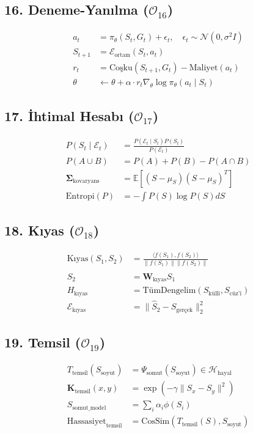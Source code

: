 \documentclass[11pt, a4paper]{article}
\begin{document}
\subsection{16. Deneme-Yanılma ($\mathcal{O}_{16}$)}
\begin{align}
a_t &= \pi_\theta(S_t, G_t) + \epsilon_t, \quad \epsilon_t \sim \mathcal{N}(0, \sigma^2 I) \\
S_{t+1} &= \mathcal{E}_{\text{ortam}}(S_t, a_t) \\
r_t &= \text{Coşku}(S_{t+1}, G_t) - \text{Maliyet}(a_t) \\
\theta &\leftarrow \theta + \alpha \cdot r_t \nabla_\theta \log \pi_\theta(a_t \mid S_t)
\end{align}

\subsection{17. İhtimal Hesabı ($\mathcal{O}_{17}$)}
\begin{align}
P(S_t \mid \mathcal{E}_t) &= \frac{P(\mathcal{E}_t \mid S_t) P(S_t)}{P(\mathcal{E}_t)} \\
P(A \cup B) &= P(A) + P(B) - P(A \cap B) \\
\mathbf{\Sigma}_{\text{kovaryans}} &= \mathbb{E}\left[ (S - \mu_S)(S - \mu_S)^T \right] \\
\text{Entropi}(P) &= -\int P(S) \log P(S) dS
\end{align}

\subsection{18. Kıyas ($\mathcal{O}_{18}$)}
\begin{align}
\text{Kıyas}(S_1, S_2) &= \frac{\langle f(S_1), f(S_2) \rangle}{\|f(S_1)\| \|f(S_2)\|} \\
\hat{S}_2 &= \mathbf{W}_{\text{kıyas}} S_1 \\
H_{\text{kıyas}} &= \text{TümDengelim}(S_{\text{küllî}}, S_{\text{cüz'î}}) \\
\mathcal{E}_{\text{kıyas}} &= \| \hat{S}_2 - S_{\text{gerçek}} \|_2^2
\end{align}

\subsection{19. Temsil ($\mathcal{O}_{19}$)}
\begin{align}
T_{\text{temsil}}(S_{\text{soyut}}) &= \Psi_{\text{somut}}(S_{\text{soyut}}) \in \mathcal{H}_{\text{hayal}} \\
\mathbf{K}_{\text{temsil}}(x, y) &= \exp\left( -\gamma \|S_x - S_y\|^2 \right) \\
S_{\text{somut\_model}} &= \sum_i \alpha_i \phi(S_i) \\
\text{Hassasiyet}_{\text{temsil}} &= \text{CosSim}\left(T_{\text{temsil}}(S), S_{\text{soyut}}\right)
\end{align}
\end{document}
